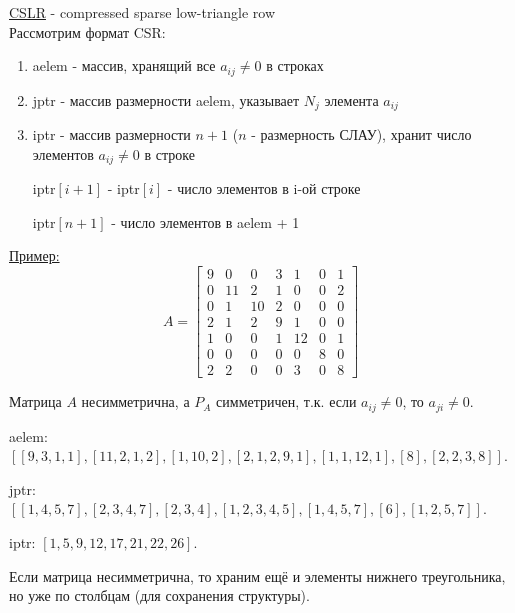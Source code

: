 \documentclass{bmstu}
\begin{document}
\underline{CSLR} - compressed sparse low-triangle row \\

Рассмотрим формат CSR:
\begin{enumerate}
	\item aelem - массив, хранящий все $a_{ij}\neq 0$ в строках
	\item jptr - массив размерности aelem, указывает $N_j$ элемента $a_{ij}$
	\item iptr - массив размерности $n+1$ ($n$ - размерность СЛАУ), хранит число элементов $a_{ij}\neq 0$ в строке
	
	iptr$[i+1]$ - iptr$[i]$ - число элементов в i-ой строке
	
	iptr$[n+1]$ - число элементов в aelem + 1
\end{enumerate}

\underline{Пример:}
\[
A=
\begin{bmatrix}
	9&0&0&3&1&0&1 \\
	0&11&2&1&0&0&2 \\
	0&1&10&2&0&0&0 \\
	2&1&2&9&1&0&0 \\
	1&0&0&1&12&0&1 \\
	0&0&0&0&0&8&0 \\
	2&2&0&0&3&0&8 
\end{bmatrix}
\]

Матрица $A$ несимметрична, а $P_A$ симметричен, т.к. если $a_{ij}\neq 0$, то $a_{ji}\neq 0$.

aelem: $\left[\left[ 9, 3, 1, 1 \right], \left[11, 2, 1, 2\right], \left[1, 10, 2\right],\left[2, 1, 2 ,9, 1\right],\left[1, 1, 12, 1\right],\left[8\right],\left[2, 2, 3, 8\right] \right]$.

jptr: $\left[\left[1, 4, 5, 7\right], \left[2, 3, 4, 7\right], \left[2, 3, 4\right],\left[1, 2, 3, 4, 5\right],\left[1, 4, 5, 7 \right],\left[6\right],\left[1, 2, 5, 7\right] \right]$.

iptr: $\left[1, 5, 9, 12, 17, 21, 22, 26\right]$.



Если матрица несимметрична, то храним ещё и элементы нижнего треугольника, но уже по столбцам (для сохранения структуры).
\end{document}
